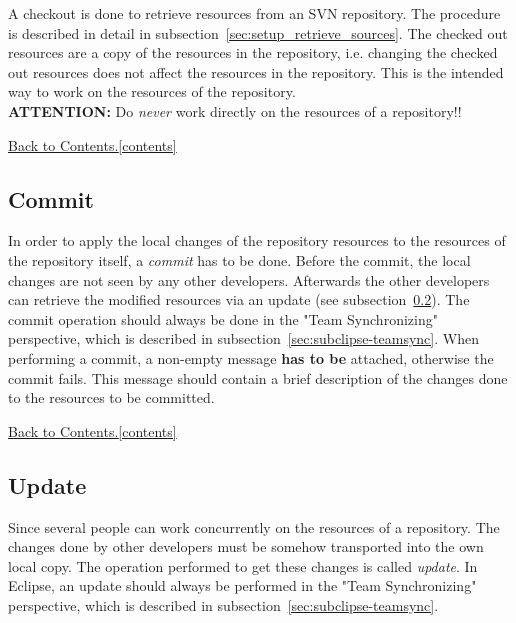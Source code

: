 \documentclass[11pt, oneside]{scrartcl}
\newcommand{\backtocontents}{\hyperref[contents]{Back to Contents.\ref*{contents}}}
\begin{document}
A checkout is done to retrieve resources from an SVN repository. The procedure
is described in detail in subsection~\ref{sec:setup_retrieve_sources}. The checked
out resources are a copy of the resources in the repository, i.e. changing the
checked out resources does not affect the resources in the repository. This is
the intended way to work on the resources of the repository.
\\[3mm]

\noindent
\textbf{ATTENTION:} Do \textit{never} work directly on the
resources of a repository!!

\backtocontents


\subsection{Commit}

In order to apply the local changes of the repository resources to the resources
of the repository itself, a \textit{commit} has to be done. Before the commit,
the local changes are not seen by any other developers. Afterwards the other
developers can retrieve the modified resources via an update (see
subsection~\ref{sec:subclipse-update}). The commit operation should always be done
in the "Team Synchronizing" perspective, which is described in
subsection~\ref{sec:subclipse-teamsync}. When performing a commit, a non-empty
message \textbf{has to be} attached, otherwise the commit fails. This message
should contain a brief description of the changes done to the resources to be
committed.
  
\backtocontents  
    
    
\subsection{Update} \label{sec:subclipse-update}

Since several people can work concurrently on the resources of a repository. The
changes done by other developers must be somehow transported into the own local
copy. The operation performed to get these changes is called \textit{update}. In
Eclipse, an update should always be performed in the "Team Synchronizing"
perspective, which is described in subsection~\ref{sec:subclipse-teamsync}.
\end{document}
